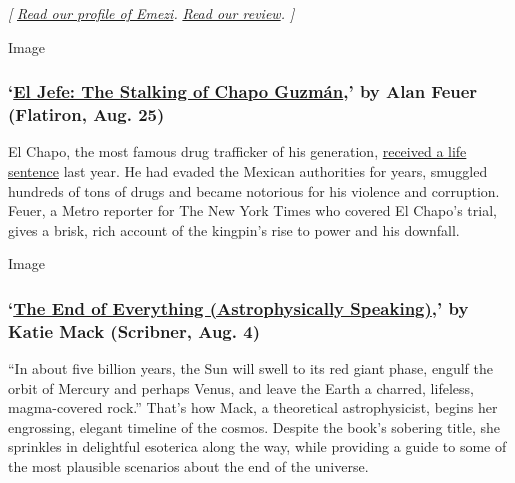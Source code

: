 \emph{{[}}
\href{https://www.nytimes.com/2019/09/09/books/akwaeke-emezi-pet-freshwater.html}{\emph{Read
our profile of Emezi}}\emph{. \textbar{}}
\href{https://www.nytimes.com/2020/07/28/books/death-vivek-oji-akwaeke-emezi-group-text.html}{\emph{Read
our review}}\emph{. {]}}

Image

\hypertarget{el-jefe-the-stalking-of-chapo-guzmuxe1n-by-alan-feuer-flatiron-aug-25}{%
\subsubsection{\texorpdfstring{`\href{https://us.macmillan.com/books/9781250254528}{El
Jefe: The Stalking of Chapo Guzmán},' by Alan Feuer (Flatiron, Aug.
25)}{`El Jefe: The Stalking of Chapo Guzmán,' by Alan Feuer (Flatiron, Aug. 25)}}\label{el-jefe-the-stalking-of-chapo-guzmuxe1n-by-alan-feuer-flatiron-aug-25}}

El Chapo, the most famous drug trafficker of his generation,
\href{https://www.nytimes.com/2019/07/17/nyregion/el-chapo-sentencing.html}{received
a life sentence} last year. He had evaded the Mexican authorities for
years, smuggled hundreds of tons of drugs and became notorious for his
violence and corruption. Feuer, a Metro reporter for The New York Times
who covered El Chapo's trial, gives a brisk, rich account of the
kingpin's rise to power and his downfall.

Image

\hypertarget{the-end-of-everything-astrophysically-speaking-by-katie-mack-scribner-aug-4}{%
\subsubsection{\texorpdfstring{`\href{https://www.simonandschuster.com/books/The-End-of-Everything/Katie-Mack/9781982103545}{The
End of Everything (Astrophysically Speaking)},' by Katie Mack (Scribner,
Aug.
4)}{`The End of Everything (Astrophysically Speaking),' by Katie Mack (Scribner, Aug. 4)}}\label{the-end-of-everything-astrophysically-speaking-by-katie-mack-scribner-aug-4}}

``In about five billion years, the Sun will swell to its red giant
phase, engulf the orbit of Mercury and perhaps Venus, and leave the
Earth a charred, lifeless, magma-covered rock.'' That's how Mack, a
theoretical astrophysicist, begins her engrossing, elegant timeline of
the cosmos. Despite the book's sobering title, she sprinkles in
delightful esoterica along the way, while providing a guide to some of
the most plausible scenarios about the end of the universe.

